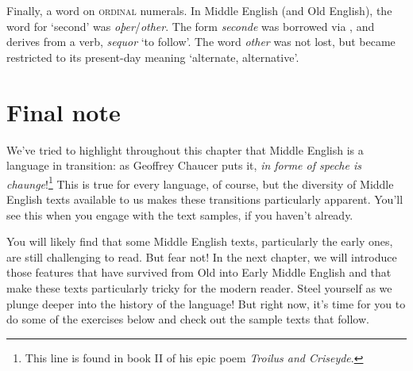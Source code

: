 Finally, a word on \textsc{ordinal} numerals. In Middle English (and Old English), the word for `second' was \emph{oþer}/\emph{other}. The form \emph{seconde} was borrowed via , and derives from a  verb, \emph{sequor} `to follow'. The word \emph{other} was not lost, but became restricted to its present-day meaning `alternate, alternative'.

\section{Final note}

We've tried to highlight throughout this chapter that Middle English is a language in transition: as Geoffrey Chaucer puts it, \emph{in forme of speche is chaunge}!\footnote{This line is found in book II of his epic poem \emph{Troilus and Criseyde}.} This is true for every language, of course, but the diversity of Middle English texts available to us makes these transitions particularly apparent. You'll see this when you engage with the text samples, if you haven't already.

You will likely find that some Middle English texts, particularly the early ones, are still challenging to read. But fear not! In the next chapter, we will introduce those features that have survived from Old into Early Middle English and that make these texts particularly tricky for the modern reader. Steel yourself as we plunge deeper into the history of the language! But right now, it's time for you to do some of the exercises below and check out the sample texts that follow.



